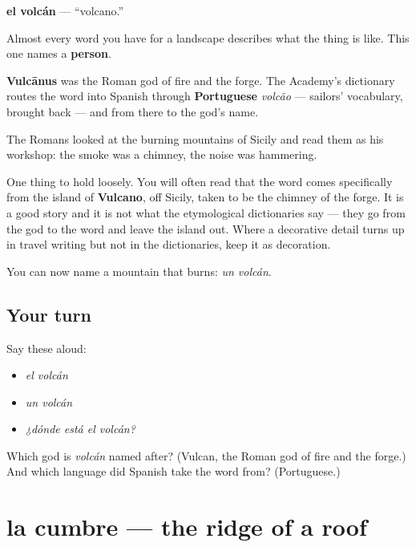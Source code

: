 \begin{cousinweb}
\textbf{el volcán} — \textquotedblleft{}volcano.\textquotedblright{}

Almost every word you have for a landscape describes what the thing is like. This one names a \textbf{person}.

\textbf{Vulcānus} was the Roman god of fire and the forge. The Academy's dictionary routes the word into Spanish through \textbf{Portuguese} \emph{volcão} — sailors' vocabulary, brought back — and from there to the god's name.

The Romans looked at the burning mountains of Sicily and read them as his workshop: the smoke was a chimney, the noise was hammering.

One thing to hold loosely. You will often read that the word comes specifically from the island of \textbf{Vulcano}, off Sicily, taken to be the chimney of the forge. It is a good story and it is not what the etymological dictionaries say — they go from the god to the word and leave the island out. Where a decorative detail turns up in travel writing but not in the dictionaries, keep it as decoration.
\end{cousinweb}

\begin{grammarlens}[title={What you've built}]
You can now name a mountain that burns: \emph{un volcán}.
\end{grammarlens}

\subsection*{Your turn}
Say these aloud:

\begin{itemize}
\raggedright
  \item \emph{el volcán}
  \item \emph{un volcán}
  \item \emph{¿dónde está el volcán?}
\end{itemize}

\begin{tcolorbox}[breakable,colback=teal!4,colframe=teal!35!black,title={Before you move on}]
Which god is \emph{volcán} named after? (Vulcan, the Roman god of fire and the forge.) And which language did Spanish take the word from? (Portuguese.)
\end{tcolorbox}
\section[la cumbre]{la cumbre — the ridge of a roof}

